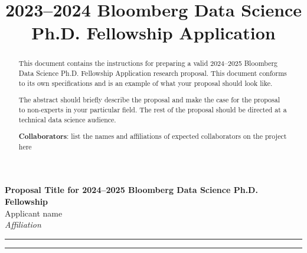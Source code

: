 \documentclass[10pt]{article}
\author{}
\title{2023--2024 Bloomberg Data Science Ph.D. Fellowship Application}
\begin{document}
	
	\begin{center}
		{\Large \textbf{Proposal Title for 2024--2025 Bloomberg Data Science Ph.D. Fellowship}}\\
		\vspace{1em}
		{\large Applicant name}\\
		\vspace{1em}
		\textit{Affiliation}
	\end{center}
	

	\begin{center}
		\rule{150mm}{0.2mm}
	\end{center}		

	\begin{abstract}
	
	This document contains the instructions for preparing a valid 2024--2025 Bloomberg Data Science Ph.D. Fellowship Application research proposal. This document conforms to its own specifications and is an example of what your proposal should look like.
	
	The abstract should briefly describe the proposal and make the case for the proposal to non-experts in your particular field. The rest of the proposal should be directed at a technical data science audience.
	
	\textbf{Collaborators}: list the names and affiliations of expected collaborators on the project here
	\end{abstract}

	\begin{center}
		\rule{150mm}{0.2mm}
	\end{center}		

	\vspace{5mm}
	
\end{document}
